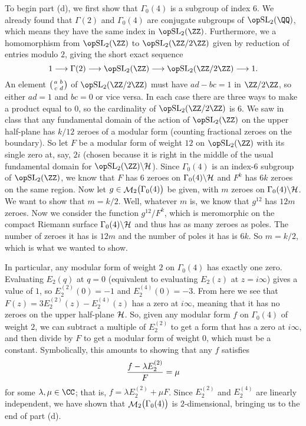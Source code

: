 To begin part (d), we first show that $\Gamma_0(4)$ is a subgroup of
index $6$. We already found that $\Gamma(2)$ and $\Gamma_0(4)$ are conjugate subgroups of $\SL_2(\QQ)$, which
means they have the same index in $\SL_2(\ZZ)$. Furthermore, we a homomorphism from $\SL_2(\ZZ)$ to
$\SL_2(\ZZ/2\ZZ)$ given by reduction of entries modulo $2$, giving the short exact sequence
$$1\longto\Gamma(2)\longto\SL_2 (\ZZ)\longto \SL_2(\ZZ/2\ZZ)\longto 1.$$
An element $\smallmatrix abcd$ of $\SL_2(\ZZ/2\ZZ)$ must have $ad-bc = 1$ in $\ZZ/2\ZZ$,
so either $ad =1$ and $bc=0$ or vice versa. In each case there are three ways to make a product equal to $0$,
so the cardinality of $\SL_2(\ZZ/2\ZZ)$ is $6$.
We saw in class that any fundamental domain of the action of $\SL_2(\ZZ)$ on the upper half-plane has
$k/12$ zeroes of a modular form (counting fractional zeroes on the boundary). So let $F$ be a modular form
of weight $12$ on $\SL_2(\ZZ)$ with its single zero at, say, $2i$ (chosen because it is right in the middle
of the usual fundamental domain for $\SL_2(\ZZ)\backslash \H$). Since $\Gamma_0(4)$ is an index-$6$ subgroup
of $\SL_2(\ZZ)$, we know that $F$ has $6$ zeroes on $\Gamma_0(4)\backslash \H$ and $F^k$ has $6k$ zeroes
on the same region. Now let $g\in \calM_2\bigl(
\Gamma_0(4)\bigr)$ be given, with $m$ zeroes on $\Gamma_0(4)\backslash \H$. We want to show that $m=k/2$.
Well, whatever $m$ is, we know that $g^{12}$ has $12m$ zeroes. Now we consider
the function $g^{12}/F^k$, which is meromorphic on the compact Riemann surface $\Gamma_0(4)\backslash \H$
and thus has as many zeroes as poles. The number of zeroes it has is $12m$ and the number of poles it
has is $6k$. So $m= k/2$, which is what we wanted to show.

In particular, any modular form of weight $2$ on $\Gamma_0(4)$ has exactly one zero.
Evaluating $E_2(q)$ at $q=0$ (equivalent to evaluating $E_2(z)$ at $z=i\infty$) gives a value of $1$,
so $E_2^{(2)}(0) = -1$ and $E_2^{(4)}(0) = -3$. From here we see that $F(z) = 3E_2^{(2)}(z) - E_2^{(4)}(z)$ has
a zero at $i\infty$, meaning that it has no zeroes on the upper half-plane $\H$. So, given
any modular form $f$ on $\Gamma_0(4)$ of weight $2$, we can subtract a multiple of $E_2^{(2)}$ to get
a form that has a zero at $i\infty$, and then divide by $F$ to get a modular form of weight $0$, which must
be a constant. Symbolically, this amounts to showing that any $f$ satisfies
$$ {f-\lambda E_2^{(2)}\over F} = \mu$$
for some $\lambda,\mu\in \CC$; that is, $f = \lambda E_2^{(2)} + \mu F$.
Since $E_2^{(2)}$ and $E_2^{(4)}$ are linearly independent,
we have shown that $\calM_2\bigl(\Gamma_0(4)\bigr)$ is $2$-dimensional, bringing us to the end of part (d).

